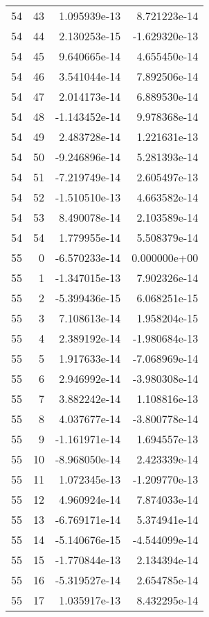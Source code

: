\begin{tabular}{rrrr}
  54 &   43 &  1.095939e-13 &  8.721223e-14 \\
  54 &   44 &  2.130253e-15 & -1.629320e-13 \\
  54 &   45 &  9.640665e-14 &  4.655450e-14 \\
  54 &   46 &  3.541044e-14 &  7.892506e-14 \\
  54 &   47 &  2.014173e-14 &  6.889530e-14 \\
  54 &   48 & -1.143452e-14 &  9.978368e-14 \\
  54 &   49 &  2.483728e-14 &  1.221631e-13 \\
  54 &   50 & -9.246896e-14 &  5.281393e-14 \\
  54 &   51 & -7.219749e-14 &  2.605497e-13 \\
  54 &   52 & -1.510510e-13 &  4.663582e-14 \\
  54 &   53 &  8.490078e-14 &  2.103589e-14 \\
  54 &   54 &  1.779955e-14 &  5.508379e-14 \\
  55 &    0 & -6.570233e-14 &  0.000000e+00 \\
  55 &    1 & -1.347015e-13 &  7.902326e-14 \\
  55 &    2 & -5.399436e-15 &  6.068251e-15 \\
  55 &    3 &  7.108613e-14 &  1.958204e-15 \\
  55 &    4 &  2.389192e-14 & -1.980684e-13 \\
  55 &    5 &  1.917633e-14 & -7.068969e-14 \\
  55 &    6 &  2.946992e-14 & -3.980308e-14 \\
  55 &    7 &  3.882242e-14 &  1.108816e-13 \\
  55 &    8 &  4.037677e-14 & -3.800778e-14 \\
  55 &    9 & -1.161971e-14 &  1.694557e-13 \\
  55 &   10 & -8.968050e-14 &  2.423339e-14 \\
  55 &   11 &  1.072345e-13 & -1.209770e-13 \\
  55 &   12 &  4.960924e-14 &  7.874033e-14 \\
  55 &   13 & -6.769171e-14 &  5.374941e-14 \\
  55 &   14 & -5.140676e-15 & -4.544099e-14 \\
  55 &   15 & -1.770844e-13 &  2.134394e-14 \\
  55 &   16 & -5.319527e-14 &  2.654785e-14 \\
  55 &   17 &  1.035917e-13 &  8.432295e-14 \\

\end{tabular}
